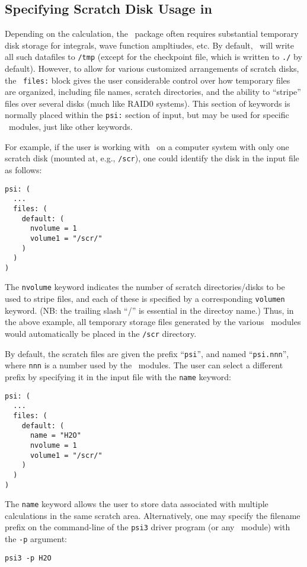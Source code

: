 \subsection{Specifying Scratch Disk Usage in \PSIthree} \label{scratchfiles}

Depending on the calculation, the \PSIthree\ package often requires
substantial temporary disk storage for integrals, wave function ampltiudes,
etc.  By default, \PSIthree\ will write all such datafiles to {\tt /tmp}
(except for the checkpoint file, which is written to {\tt ./} by default).
However, to allow for various customized arrangements of scratch disks,
the \PSIthree\ {\tt files:} block gives the user considerable control
over how temporary files are organized, including file names, scratch
directories, and the ability to ``stripe'' files over several disks (much
like RAID0 systems).  This section of keywords is normally placed within
the {\tt psi:} section of input, but may be used for specific \PSIthree\
modules, just like other keywords.

For example, if the user is working with \PSIthree\ on a computer
system with only one scratch disk (mounted at, e.g., {\tt /scr}), one
could identify the disk in the input file as follows:
\begin{verbatim}
psi: (
  ...
  files: (
    default: (
      nvolume = 1
      volume1 = "/scr/"
    )
  )
)
\end{verbatim}
The {\tt nvolume} keyword indicates the number of scratch
directories/disks to be used to stripe files, and each of these is
specified by a corresponding {\tt volumen} keyword.  (NB: the trailing
slash ``/'' is essential in the directoy name.)  Thus, in the above
example, all temporary storage files generated by the various
\PSIthree\ modules would automatically be placed in the {\tt /scr}
directory.  

By default, the scratch files are given the prefix ``{\tt psi}'', and
named ``{\tt psi.nnn}'', where {\tt nnn} is a number used by the
\PSIthree\ modules.  The user can select a different prefix by
specifying it in the input file with the {\tt name} keyword:
\begin{verbatim}
psi: (
  ...
  files: (
    default: (
      name = "H2O"
      nvolume = 1
      volume1 = "/scr/"
    )
  )
)
\end{verbatim}
The {\tt name} keyword allows the user to store data associated with
multiple calculations in the same scratch area.  Alternatively, one
may specify the filename prefix on the command-line of the {\tt psi3}
driver program (or any \PSIthree\ module) with the {\tt -p} argument:
\begin{verbatim}
psi3 -p H2O
\end{verbatim}

